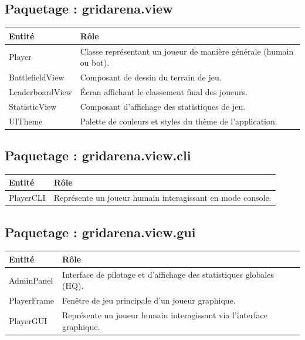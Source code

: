 \documentclass[12pt, a4paper]{article}
\begin{document}
\subsection{Paquetage : gridarena.view}
\begin{tabular}{|p{7cm}|p{8cm}|}
\hline
\textbf{Entité} & \textbf{Rôle} \\ \hline
Player & Classe représentant un joueur de manière générale (humain ou bot). \\ \hline
BattlefieldView & Composant de dessin du terrain de jeu. \\ \hline
LeaderboardView & Écran affichant le classement final des joueurs. \\ \hline
StatisticView & Composant d'affichage des statistiques de jeu. \\ \hline
UITheme & Palette de couleurs et styles du thème de l'application. \\ \hline
\end{tabular}

\subsection{Paquetage : gridarena.view.cli}
\begin{tabular}{|p{7cm}|p{8cm}|}
\hline
\textbf{Entité} & \textbf{Rôle} \\ \hline
PlayerCLI & Représente un joueur humain interagissant en mode console. \\ \hline
\end{tabular}

\subsection{Paquetage : gridarena.view.gui}
\begin{tabular}{|p{7cm}|p{8cm}|}
\hline
\textbf{Entité} & \textbf{Rôle} \\ \hline
AdminPanel & Interface de pilotage et d'affichage des statistiques globales (HQ). \\ \hline
PlayerFrame & Fenêtre de jeu principale d'un joueur graphique. \\ \hline
PlayerGUI & Représente un joueur humain interagissant via l'interface graphique. \\ \hline
\end{tabular}
\end{document}
